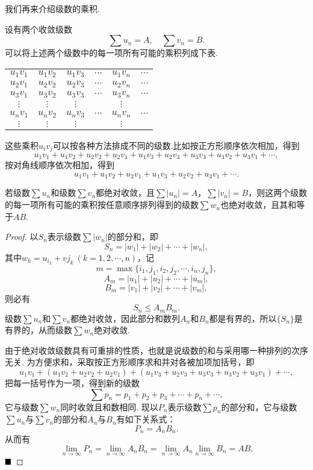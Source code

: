 我们再来介绍级数的乘积.

设有两个收敛级数
$$\sum u_n=A,\quad \sum v_n=B.$$
可以将上述两个级数中的每一项所有可能的乘积列成下表.
\begin{center}
	\begin{tabular}{|cccccc}
		\hline
		$u_1v_1$ & $u_1v_2$ & $u_1v_3$ & $\cdots$ & $u_1v_n$ & $\cdots$ \\
		$u_2v_1$ & $u_2v_2$ & $u_2v_3$ & $\cdots$ & $u_2v_n$ & $\cdots$ \\
		$u_3v_1$ & $u_3v_2$ & $u_3v_3$ & $\cdots$ & $u_3v_n$ & $\cdots$ \\
		$\vdots$ & $\vdots$ & $\vdots$ & $		$ & $\vdots$ & $	  $ \\
		$u_nv_1$ & $u_nv_2$ & $u_nv_3$ & $\cdots$ & $u_nv_n$ & $\cdots$ \\
		$\vdots$ & $\vdots$ & $\vdots$ & $		$ & $\vdots$ & $	  $ \\
	\end{tabular}
\end{center}

这些乘积$u_iv_j$可以按各种方法排成不同的级数.比如按正方形顺序依次相加，得到
$$u_1v_1+u_1v_2+u_2v_2+u_2v_1+u_1v_3+u_2v_3+u_3v_3+u_3v_2+u_3v_1+\cdots,$$
按对角线顺序依次相加，得到
$$u_1v_1+u_1v_2+u_2v_1+u_1v_3+u_2v_2+u_3v_1+\cdots.$$
\begin{theorem}[Cauchy定理]
	若级数$\sum u_n$和级数$\sum v_n$都绝对收敛，且$\sum |u_n|=A$，$\sum |v_n|=B$，则这两个级数的每一项所有可能的乘积按任意顺序排列得到的级数$\sum w_n$也绝对收敛，且其和等于$AB$.
\end{theorem}
\begin{proof}
	以$S_n$表示级数$\sum |w_n|$的部分和，即
	$$S_n=|w_1|+|w_2|+\cdots+|w_n|,$$
	其中$w_k=u_{i_k}+v{j_k}\ (k=1,2,\cdots,n)$，记
	$$m=\max\{i_1,j_1,i_2,j_2,\cdots,i_n,j_n\},$$
	$$A_m=|u_1|+|u_2|+\cdots+|u_m|,$$
	$$B_m=|v_1|+|v_2|+\cdots+|v_m|,$$
	则必有
	$$S_n\leqslant A_mB_m.$$
	级数$\sum u_n$和$\sum v_n$都绝对收敛，因此部分和数列$A_n$和$B_n$都是有界的，所以$\{S_n\}$是有界的，从而级数$\sum w_n$绝对收敛.
	
	由于绝对收敛级数具有可重排的性质，也就是说级数的和与采用哪一种排列的次序无关. 为方便求和，采取按正方形顺序求和并对各被加项加括号，即
	$$u_1v_1+(u_1v_2+u_2v_2+u_2v_1)+(u_1v_3+u_2v_3+u_3v_3+u_3v_2+u_3v_1)+\cdots,$$
	把每一括号作为一项，得到新的级数
	$$\sum p_n=p_1+p_2+p_3+\cdots+p_n+\cdots,$$
	它与级数$\sum w_n$同时收敛且和数相同. 现以$P_n$表示级数$\sum p_n$的部分和，它与级数$\sum u_n$与$\sum v_n$的部分和$A_n$与$B_n$有如下关系式：
	$$P_n=A_nB_n.$$
	从而有
	$$\lim\limits_{n\to\infty}P_n=\lim\limits_{n\to\infty}A_nB_n=\lim\limits_{n\to\infty}A_n\lim\limits_{n\to\infty}B_n=AB.$$
	$\hfill\blacksquare$
\end{proof}
